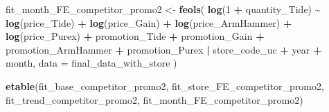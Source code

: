 \documentclass[
]{article}
\newenvironment{Shaded}{\begin{snugshade}}{\end{snugshade}}
\newcommand{\AttributeTok}[1]{\textcolor[rgb]{0.13,0.29,0.53}{#1}}
\newcommand{\DecValTok}[1]{\textcolor[rgb]{0.00,0.00,0.81}{#1}}
\newcommand{\FunctionTok}[1]{\textcolor[rgb]{0.13,0.29,0.53}{\textbf{#1}}}
\newcommand{\NormalTok}[1]{#1}
\newcommand{\OtherTok}[1]{\textcolor[rgb]{0.56,0.35,0.01}{#1}}
\newcommand{\SpecialCharTok}[1]{\textcolor[rgb]{0.81,0.36,0.00}{\textbf{#1}}}
\begin{document}
\begin{Shaded}
\begin{Highlighting}[]
\NormalTok{fit\_month\_FE\_competitor\_promo2 }\OtherTok{\textless{}{-}} \FunctionTok{feols}\NormalTok{(}
  \FunctionTok{log}\NormalTok{(}\DecValTok{1} \SpecialCharTok{+}\NormalTok{ quantity\_Tide) }\SpecialCharTok{\textasciitilde{}} \FunctionTok{log}\NormalTok{(price\_Tide) }\SpecialCharTok{+} \FunctionTok{log}\NormalTok{(price\_Gain) }\SpecialCharTok{+} 
    \FunctionTok{log}\NormalTok{(price\_ArmHammer) }\SpecialCharTok{+} \FunctionTok{log}\NormalTok{(price\_Purex) }\SpecialCharTok{+}\NormalTok{ promotion\_Tide }\SpecialCharTok{+} 
\NormalTok{    promotion\_Gain }\SpecialCharTok{+}\NormalTok{ promotion\_ArmHammer }\SpecialCharTok{+}\NormalTok{ promotion\_Purex }\SpecialCharTok{|}\NormalTok{ store\_code\_uc }\SpecialCharTok{+} 
\NormalTok{    year }\SpecialCharTok{+}\NormalTok{ month, }\AttributeTok{data =}\NormalTok{ final\_data\_with\_store}
\NormalTok{)}

\FunctionTok{etable}\NormalTok{(fit\_base\_competitor\_promo2, fit\_store\_FE\_competitor\_promo2, }
\NormalTok{       fit\_trend\_competitor\_promo2, fit\_month\_FE\_competitor\_promo2)}
\end{Highlighting}
\end{Shaded}
\end{document}
